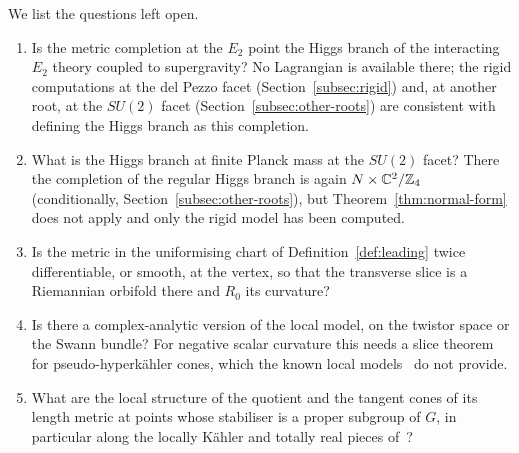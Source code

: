 We list the questions left open.
\begin{enumerate}
\item Is the metric completion at the $E_2$ point the Higgs branch of the interacting $E_2$ theory
 coupled to supergravity? No Lagrangian is available there; the rigid computations at the del Pezzo
 facet (Section~\ref{subsec:rigid}) and, at another root, at the $SU(2)$ facet
 (Section~\ref{subsec:other-roots}) are consistent with defining the Higgs branch as this completion.
\item What is the Higgs branch at finite Planck mass at the $SU(2)$ facet? There the completion of the
 regular Higgs branch is again $N\times\mathbb C^2/\mathbb Z_4$ (conditionally, Section~\ref{subsec:other-roots}),
 but Theorem~\ref{thm:normal-form} does not apply and only the rigid model has been computed.
\item Is the metric in the uniformising chart of Definition~\ref{def:leading} twice differentiable, or
 smooth, at the vertex, so that the transverse slice is a Riemannian orbifold there and $R_0$ its
 curvature?
\item Is there a complex-analytic version of the local model, on the twistor space or the Swann bundle?
 For negative scalar curvature this needs a slice theorem for pseudo-hyperk\"ahler cones, which the known
 local models~\cite{Mayrand:2022} do not provide.
\item What are the local structure of the quotient and the tangent cones of its length metric at points
 whose stabiliser is a proper subgroup of $G$, in particular along the locally K\"ahler and totally real
 pieces of~\cite[Sect.~5]{DancerSwann:1997}?
\end{enumerate}

